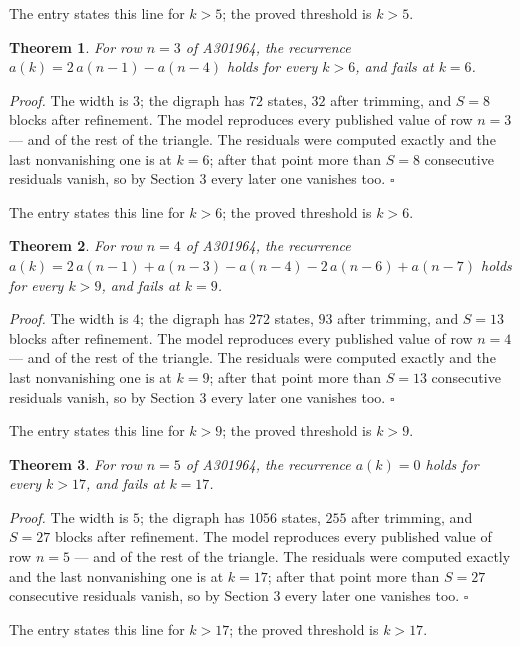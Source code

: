 \documentclass[11pt]{article}
\newtheorem{theorem}{Theorem}
\theoremstyle{definition}
\begin{document}
The entry states this line for $k > 5$; the proved threshold is $k > 5$.

\begin{theorem} For row $n = 3$ of A301964, the recurrence $a(k) = 2\,a(n-1) - a(n-4)$ holds for every $k > 6$, and fails at $k = 6$.\end{theorem}

{\itshape Proof.} The width is $3$; the digraph has $72$ states, $32$ after trimming, and $S = 8$ blocks after refinement. The model reproduces every published value of row $n = 3$ --- and of the rest of the triangle. The residuals were computed exactly and the last nonvanishing one is at $k = 6$; after that point more than $S = 8$ consecutive residuals vanish, so by Section 3 every later one vanishes too. $\square$

The entry states this line for $k > 6$; the proved threshold is $k > 6$.

\begin{theorem} For row $n = 4$ of A301964, the recurrence $a(k) = 2\,a(n-1) + a(n-3) - a(n-4) - 2\,a(n-6) + a(n-7)$ holds for every $k > 9$, and fails at $k = 9$.\end{theorem}

{\itshape Proof.} The width is $4$; the digraph has $272$ states, $93$ after trimming, and $S = 13$ blocks after refinement. The model reproduces every published value of row $n = 4$ --- and of the rest of the triangle. The residuals were computed exactly and the last nonvanishing one is at $k = 9$; after that point more than $S = 13$ consecutive residuals vanish, so by Section 3 every later one vanishes too. $\square$

The entry states this line for $k > 9$; the proved threshold is $k > 9$.

\begin{theorem} For row $n = 5$ of A301964, the recurrence $a(k) = 0$ holds for every $k > 17$, and fails at $k = 17$.\end{theorem}

{\itshape Proof.} The width is $5$; the digraph has $1056$ states, $255$ after trimming, and $S = 27$ blocks after refinement. The model reproduces every published value of row $n = 5$ --- and of the rest of the triangle. The residuals were computed exactly and the last nonvanishing one is at $k = 17$; after that point more than $S = 27$ consecutive residuals vanish, so by Section 3 every later one vanishes too. $\square$

The entry states this line for $k > 17$; the proved threshold is $k > 17$.
\end{document}
